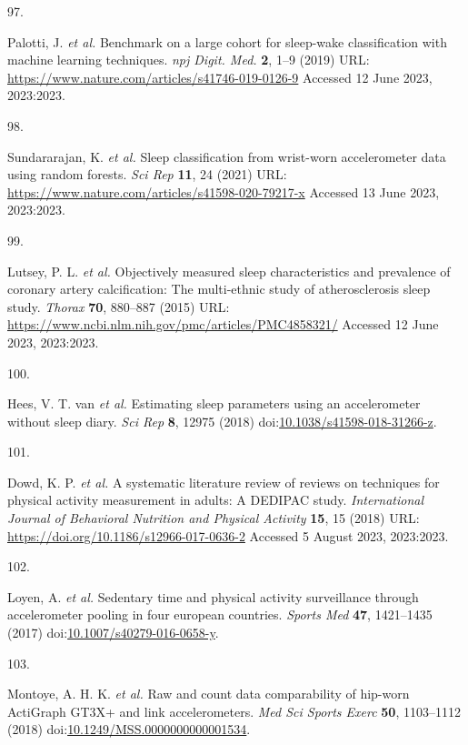 \documentclass[
  10pt,
]{scrbook}
\newlength{\cslhangindent}
\newlength{\csllabelwidth}
\newlength{\cslentryspacingunit} %
\newenvironment{CSLReferences}[2] %
 {%
  \setlength{\parindent}{0pt}
  \ifodd #1
  \let\oldpar\par
  \def\par{\hangindent=\cslhangindent\oldpar}
  \fi
  \setlength{\parskip}{#2\cslentryspacingunit}
 }%
 {}
\newcommand{\CSLLeftMargin}[1]{\parbox[t]{\csllabelwidth}{#1}}
\newcommand{\CSLRightInline}[1]{\parbox[t]{\linewidth - \csllabelwidth}{#1}\break}
\begin{document}
\begin{CSLReferences}{0}{0}
\leavevmode{}%
\CSLLeftMargin{97. }%
\CSLRightInline{Palotti, J. \emph{et al.} Benchmark on a large cohort
for sleep-wake classification with machine learning techniques.
\emph{npj Digit. Med.} \textbf{2}, 1--9 (2019) URL:
\url{https://www.nature.com/articles/s41746-019-0126-9} Accessed 12 June
2023, 2023:2023.}

\leavevmode{}%
\CSLLeftMargin{98. }%
\CSLRightInline{Sundararajan, K. \emph{et al.} Sleep classification from
wrist-worn accelerometer data using random forests. \emph{Sci Rep}
\textbf{11}, 24 (2021) URL:
\url{https://www.nature.com/articles/s41598-020-79217-x} Accessed 13
June 2023, 2023:2023.}

\leavevmode{}%
\CSLLeftMargin{99. }%
\CSLRightInline{Lutsey, P. L. \emph{et al.} Objectively measured sleep
characteristics and prevalence of coronary artery calcification: The
multi-ethnic study of atherosclerosis sleep study. \emph{Thorax}
\textbf{70}, 880--887 (2015) URL:
\url{https://www.ncbi.nlm.nih.gov/pmc/articles/PMC4858321/} Accessed 12
June 2023, 2023:2023.}

\leavevmode{}%
\CSLLeftMargin{100. }%
\CSLRightInline{Hees, V. T. van \emph{et al.} Estimating sleep
parameters using an accelerometer without sleep diary. \emph{Sci Rep}
\textbf{8}, 12975 (2018)
doi:\href{https://doi.org/10.1038/s41598-018-31266-z}{10.1038/s41598-018-31266-z}.}

\leavevmode{}%
\CSLLeftMargin{101. }%
\CSLRightInline{Dowd, K. P. \emph{et al.} A systematic literature review
of reviews on techniques for physical activity measurement in adults: A
{DEDIPAC} study. \emph{International Journal of Behavioral Nutrition and
Physical Activity} \textbf{15}, 15 (2018) URL:
\url{https://doi.org/10.1186/s12966-017-0636-2} Accessed 5 August 2023,
2023:2023.}

\leavevmode{}%
\CSLLeftMargin{102. }%
\CSLRightInline{Loyen, A. \emph{et al.} Sedentary time and physical
activity surveillance through accelerometer pooling in four european
countries. \emph{Sports Med} \textbf{47}, 1421--1435 (2017)
doi:\href{https://doi.org/10.1007/s40279-016-0658-y}{10.1007/s40279-016-0658-y}.}

\leavevmode{}%
\CSLLeftMargin{103. }%
\CSLRightInline{Montoye, A. H. K. \emph{et al.} Raw and count data
comparability of hip-worn {ActiGraph} {GT}3X+ and link accelerometers.
\emph{Med Sci Sports Exerc} \textbf{50}, 1103--1112 (2018)
doi:\href{https://doi.org/10.1249/MSS.0000000000001534}{10.1249/MSS.0000000000001534}.}


\end{CSLReferences}
\end{document}

